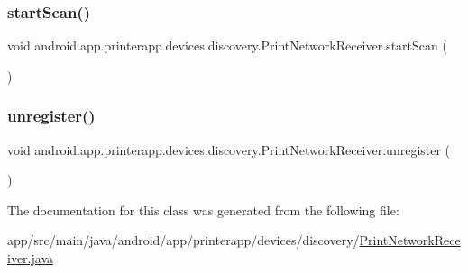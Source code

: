 \subsubsection{\texorpdfstring{start\+Scan()}{startScan()}}
{\footnotesize\ttfamily void android.\+app.\+printerapp.\+devices.\+discovery.\+Print\+Network\+Receiver.\+start\+Scan (\begin{DoxyParamCaption}{ }\end{DoxyParamCaption})}

\mbox{\label{classandroid_1_1app_1_1printerapp_1_1devices_1_1discovery_1_1_print_network_receiver_a4737b471fee26675b2ba323b7fd89229}} 
\subsubsection{\texorpdfstring{unregister()}{unregister()}}
{\footnotesize\ttfamily void android.\+app.\+printerapp.\+devices.\+discovery.\+Print\+Network\+Receiver.\+unregister (\begin{DoxyParamCaption}{ }\end{DoxyParamCaption})}



The documentation for this class was generated from the following file\+:\begin{DoxyCompactItemize}
\item 
app/src/main/java/android/app/printerapp/devices/discovery/\hyperlink{_print_network_receiver_8java}{Print\+Network\+Receiver.\+java}\end{DoxyCompactItemize}
